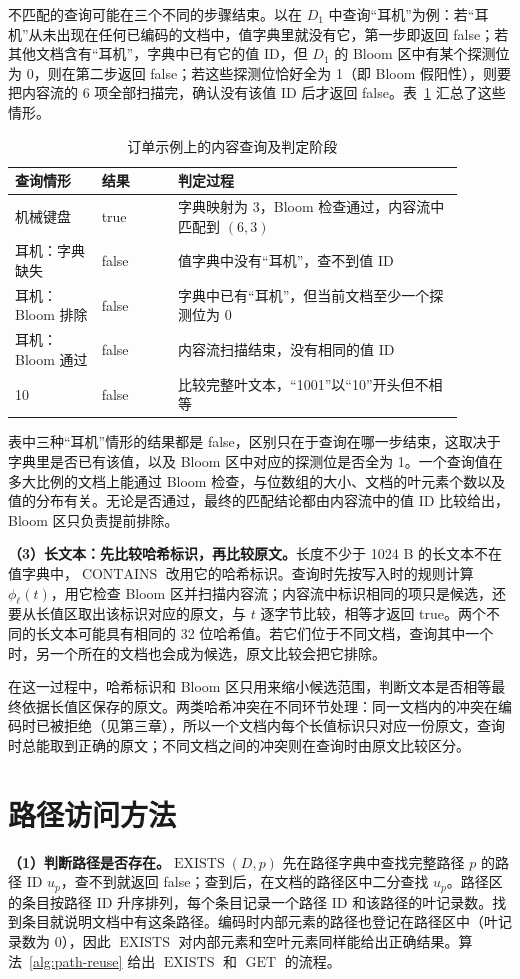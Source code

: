 不匹配的查询可能在三个不同的步骤结束。以在 $D_1$ 中查询“耳机”为例：若“耳机”从未出现在任何已编码的文档中，值字典里就没有它，第一步即返回 false；若其他文档含有“耳机”，字典中已有它的值 ID，但 $D_1$ 的 Bloom 区中有某个探测位为 0，则在第二步返回 false；若这些探测位恰好全为 1（即 Bloom 假阳性），则要把内容流的 6 项全部扫描完，确认没有该值 ID 后才返回 false。表~\ref{tab:query-example-content} 汇总了这些情形。
\begin{table}[htbp]
\centering\small
\caption{订单示例上的内容查询及判定阶段}
\label{tab:query-example-content}
\begin{tabular}{p{0.17\linewidth}p{0.15\linewidth}p{0.57\linewidth}}
\toprule
查询情形 & 结果 & 判定过程 \\
\midrule
机械键盘 & true & 字典映射为 3，Bloom 检查通过，内容流中匹配到 $(6,3)$ \\
耳机：字典缺失 & false & 值字典中没有“耳机”，查不到值 ID \\
耳机：Bloom 排除 & false & 字典中已有“耳机”，但当前文档至少一个探测位为 0 \\
耳机：Bloom 通过 & false & 内容流扫描结束，没有相同的值 ID \\
10 & false & 比较完整叶文本，“1001”以“10”开头但不相等 \\
\bottomrule
\end{tabular}
\end{table}
表中三种“耳机”情形的结果都是 false，区别只在于查询在哪一步结束，这取决于字典里是否已有该值，以及 Bloom 区中对应的探测位是否全为 1。一个查询值在多大比例的文档上能通过 Bloom 检查，与位数组的大小、文档的叶元素个数以及值的分布有关。无论是否通过，最终的匹配结论都由内容流中的值 ID 比较给出，Bloom 区只负责提前排除。

\textbf{（3）长文本：先比较哈希标识，再比较原文。}长度不少于 1024 B 的长文本不在值字典中，$\operatorname{CONTAINS}$ 改用它的哈希标识。查询时先按写入时的规则计算 $\phi_\ell(t)$，用它检查 Bloom 区并扫描内容流；内容流中标识相同的项只是候选，还要从长值区取出该标识对应的原文，与 $t$ 逐字节比较，相等才返回 true。两个不同的长文本可能具有相同的 32 位哈希值。若它们位于不同文档，查询其中一个时，另一个所在的文档也会成为候选，原文比较会把它排除。

在这一过程中，哈希标识和 Bloom 区只用来缩小候选范围，判断文本是否相等最终依据长值区保存的原文。两类哈希冲突在不同环节处理：同一文档内的冲突在编码时已被拒绝（见第三章），所以一个文档内每个长值标识只对应一份原文，查询时总能取到正确的原文；不同文档之间的冲突则在查询时由原文比较区分。

\section{路径访问方法}
\textbf{（1）判断路径是否存在。}$\operatorname{EXISTS}(D,p)$ 先在路径字典中查找完整路径 $p$ 的路径 ID $u_p$，查不到就返回 false；查到后，在文档的路径区中二分查找 $u_p$。路径区的条目按路径 ID 升序排列，每个条目记录一个路径 ID 和该路径的叶记录数。找到条目就说明文档中有这条路径。编码时内部元素的路径也登记在路径区中（叶记录数为 0），因此 $\operatorname{EXISTS}$ 对内部元素和空叶元素同样能给出正确结果。算法~\ref{alg:path-reuse} 给出 $\operatorname{EXISTS}$ 和 $\operatorname{GET}$ 的流程。

